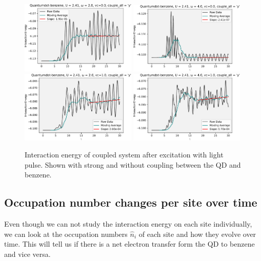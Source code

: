 \begin{figure}[!hbt]
    \centering
    \includegraphics[width=0.49\textwidth]{graph/potential_energy/Epot_w2_vc0.pdf}
    \includegraphics[width=0.49\textwidth]{graph/potential_energy/Epot_w4_vc0.pdf}
    \includegraphics[width=0.49\textwidth]{graph/potential_energy/Epot_w2_vc1.pdf}
    \includegraphics[width=0.49\textwidth]{graph/potential_energy/Epot_w4_vc1.pdf}
    \caption{Interaction energy of coupled system after excitation with light pulse. Shown with strong and without coupling between the QD and benzene.}
    \label{fig:interaction_energy_omega}
\end{figure}

\subsection{Occupation number changes per site over time}
Even though we can not study the interaction energy on each site individually, we can look at the occupation numbers $\hat{n}_i$ of each site and how they evolve over time. This will tell us if there is a net electron transfer form the QD to benzene and vice versa.

